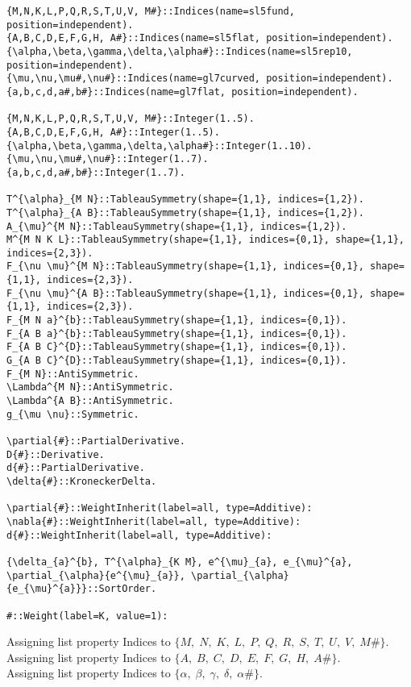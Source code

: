 \documentclass[11pt]{article}
\begin{document}
{\color[named]{Blue}\begin{verbatim}
{M,N,K,L,P,Q,R,S,T,U,V, M#}::Indices(name=sl5fund, position=independent).
{A,B,C,D,E,F,G,H, A#}::Indices(name=sl5flat, position=independent).
{\alpha,\beta,\gamma,\delta,\alpha#}::Indices(name=sl5rep10, position=independent).
{\mu,\nu,\mu#,\nu#}::Indices(name=gl7curved, position=independent).
{a,b,c,d,a#,b#}::Indices(name=gl7flat, position=independent).

{M,N,K,L,P,Q,R,S,T,U,V, M#}::Integer(1..5).
{A,B,C,D,E,F,G,H, A#}::Integer(1..5).
{\alpha,\beta,\gamma,\delta,\alpha#}::Integer(1..10).
{\mu,\nu,\mu#,\nu#}::Integer(1..7).
{a,b,c,d,a#,b#}::Integer(1..7).

T^{\alpha}_{M N}::TableauSymmetry(shape={1,1}, indices={1,2}).
T^{\alpha}_{A B}::TableauSymmetry(shape={1,1}, indices={1,2}).
A_{\mu}^{M N}::TableauSymmetry(shape={1,1}, indices={1,2}).
M^{M N K L}::TableauSymmetry(shape={1,1}, indices={0,1}, shape={1,1}, indices={2,3}).
F_{\nu \mu}^{M N}::TableauSymmetry(shape={1,1}, indices={0,1}, shape={1,1}, indices={2,3}).
F_{\nu \mu}^{A B}::TableauSymmetry(shape={1,1}, indices={0,1}, shape={1,1}, indices={2,3}).
F_{M N a}^{b}::TableauSymmetry(shape={1,1}, indices={0,1}).
F_{A B a}^{b}::TableauSymmetry(shape={1,1}, indices={0,1}).
F_{A B C}^{D}::TableauSymmetry(shape={1,1}, indices={0,1}).
G_{A B C}^{D}::TableauSymmetry(shape={1,1}, indices={0,1}).
F_{M N}::AntiSymmetric.
\Lambda^{M N}::AntiSymmetric.
\Lambda^{A B}::AntiSymmetric.
g_{\mu \nu}::Symmetric.

\partial{#}::PartialDerivative.
D{#}::Derivative.
d{#}::PartialDerivative.
\delta{#}::KroneckerDelta.

\partial{#}::WeightInherit(label=all, type=Additive):
\nabla{#}::WeightInherit(label=all, type=Additive):
d{#}::WeightInherit(label=all, type=Additive):

{\delta_{a}^{b}, T^{\alpha}_{K M}, e^{\mu}_{a}, e_{\mu}^{a}, \partial_{\alpha}{e^{\mu}_{a}}, \partial_{\alpha}{e_{\mu}^{a}}}::SortOrder.

#::Weight(label=K, value=1):
\end{verbatim}}
Assigning list property Indices to $\{M,\; N,\; K,\; L,\; P,\; Q,\; R,\; S,\; T,\; U,\; V,\; M\#\}$.
\\
Assigning list property Indices to $\{A,\; B,\; C,\; D,\; E,\; F,\; G,\; H,\; A\#\}$.
\\
Assigning list property Indices to $\{\alpha,\; \beta,\; \gamma,\; \delta,\; \alpha\#\}$.
\end{document}
